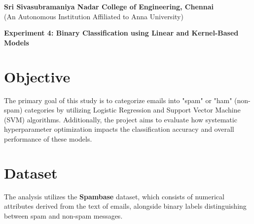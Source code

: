 \documentclass[11pt]{article}
\begin{document}
\begin{center}
    \large \textbf{Sri Sivasubramaniya Nadar College of Engineering, Chennai} \\
    (An Autonomous Institution Affiliated to Anna University) \\
    \vspace{0.3cm}
\end{center}
\begin{table}[h]
\renewcommand{\arraystretch}{1.4}
\end{table}


\begin{center}
\textbf{Experiment 4: Binary Classification using Linear and Kernel-Based Models}
\end{center}

\section*{Objective}
The primary goal of this study is to categorize emails into "spam" or "ham" (non-spam) categories by utilizing Logistic Regression and Support Vector Machine (SVM) algorithms. Additionally, the project aims to evaluate how systematic hyperparameter optimization impacts the classification accuracy and overall performance of these models.

\section*{Dataset}
The analysis utilizes the \textbf{Spambase} dataset, which consists of numerical attributes derived from the text of emails, alongside binary labels distinguishing between spam and non-spam messages.
\end{document}
